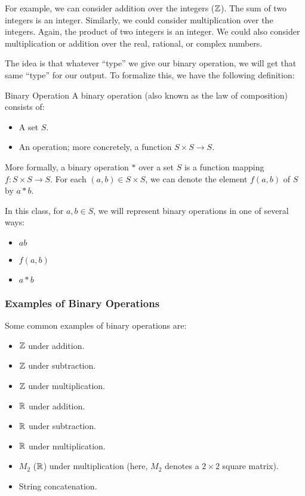\documentclass[letterpaper]{article}
\begin{document}
\bigskip 

For example, we can consider addition over the integers ($\mathbb{Z}$). The sum of two integers is an integer. Similarly, we could consider multiplication over the integers. Again, the product of two integers is an integer. We could also consider multiplication or addition over the real, rational, or complex numbers. 

\bigskip 

The idea is that whatever ``type'' we give our binary operation, we will get that same ``type'' for our output. To formalize this, we have the following definition:  
\begin{definition}{Binary Operation}{}
    A binary operation (also known as the law of composition) consists of: 
    \begin{itemize}
        \item A set $S$. 
        \item An operation; more concretely, a function $S \times S \to S$.
    \end{itemize}

    More formally, a binary operation $*$ over a set $S$ is a function mapping $f: S \times S \to S$. For each $(a, b) \in S \times S$, we can denote the element $f(a, b)$ of $S$ by $a * b$.

    \bigskip 

    In this class, for $a, b \in S$, we will represent binary operations in one of several ways: 
    \begin{itemize}
        \item $ab$
        \item $f(a, b)$
        \item $a * b$
    \end{itemize}
\end{definition}


\subsubsection{Examples of Binary Operations}
Some common examples of binary operations are: 
\begin{itemize}
    \item $\mathbb{Z}$ under addition. 
    \item $\mathbb{Z}$ under subtraction. 
    \item $\mathbb{Z}$ under multiplication. 
    \item $\mathbb{R}$ under addition. 
    \item $\mathbb{R}$ under subtraction. 
    \item $\mathbb{R}$ under multiplication.
    \item $M_{2}$ ($\mathbb{R}$) under multiplication (here, $M_{2}$ denotes a $2 \times 2$ square matrix). 
    \item String concatenation.
\end{itemize}
\end{document}
